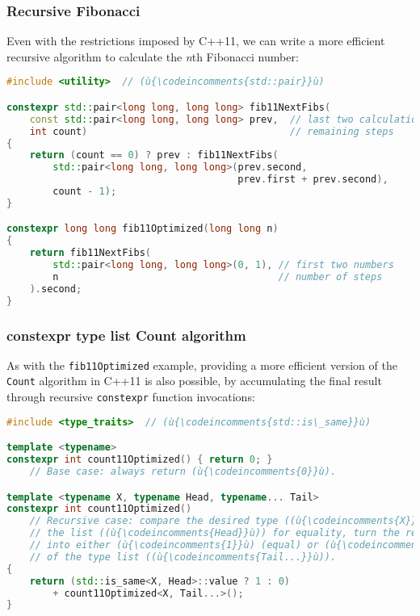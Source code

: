 \subsubsection[Recursive Fibonacci]{Recursive Fibonacci}\label{recursive-fibonacci}

Even with the restrictions imposed by C++11, we can write a
more efficient recursive algorithm to calculate the \emph{n\/}th
Fibonacci number:

\begin{lstlisting}[language=C++]
#include <utility>  // (ù{\codeincomments{std::pair}}ù)

constexpr std::pair<long long, long long> fib11NextFibs(
    const std::pair<long long, long long> prev,  // last two calculations
    int count)                                   // remaining steps
{
    return (count == 0) ? prev : fib11NextFibs(
        std::pair<long long, long long>(prev.second,
                                        prev.first + prev.second),
        count - 1);
}

constexpr long long fib11Optimized(long long n)
{
    return fib11NextFibs(
        std::pair<long long, long long>(0, 1), // first two numbers
        n                                      // number of steps
    ).second;
}
\end{lstlisting}


\subsubsection[{\ttfamily constexpr} type list {\ttfamily Count} algorithm]{{\SubsubsecCode constexpr} type list {\SubsubsecCode Count} algorithm}\label{constexpr-typelist-count-algorithm}

As with the \texttt{fib11Optimized} example, providing a more efficient version of the \texttt{Count} algorithm in
C++11 is also possible, by accumulating the final result through recursive
\texttt{constexpr} function invocations:

\begin{lstlisting}[language=C++]
#include <type_traits>  // (ù{\codeincomments{std::is\_same}}ù)

template <typename>
constexpr int count11Optimized() { return 0; }
    // Base case: always return (ù{\codeincomments{0}}ù).

template <typename X, typename Head, typename... Tail>
constexpr int count11Optimized()
    // Recursive case: compare the desired type ((ù{\codeincomments{X}}ù)) and the first type in
    // the list ((ù{\codeincomments{Head}}ù)) for equality, turn the result of the comparison
    // into either (ù{\codeincomments{1}}ù) (equal) or (ù{\codeincomments{0}}ù) (not equal), and recurse with the rest
    // of the type list ((ù{\codeincomments{Tail...}}ù)).
{
    return (std::is_same<X, Head>::value ? 1 : 0)
        + count11Optimized<X, Tail...>();
}
\end{lstlisting}

